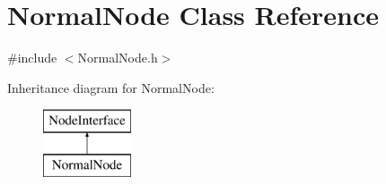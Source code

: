 \hypertarget{class_normal_node}{}\section{Normal\+Node Class Reference}
\label{class_normal_node}


{\ttfamily \#include $<$Normal\+Node.\+h$>$}

Inheritance diagram for Normal\+Node\+:\begin{figure}[H]
\begin{center}
\leavevmode
\includegraphics[height=2.000000cm]{class_normal_node}
\end{center}
\end{figure}
